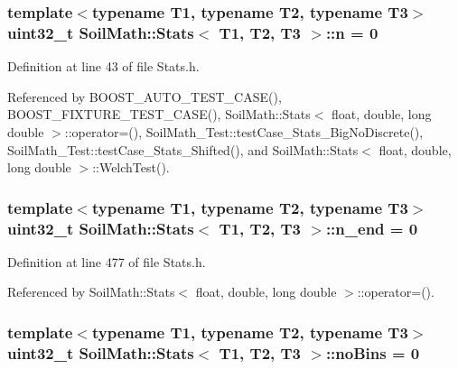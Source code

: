 \subsubsection[{n}]{\setlength{\rightskip}{0pt plus 5cm}template$<$typename T1, typename T2, typename T3$>$ uint32\+\_\+t {\bf Soil\+Math\+::\+Stats}$<$ T1, T2, T3 $>$\+::n = 0}\label{class_soil_math_1_1_stats_a7bc57af334b68253832ebac17f85d091}


Definition at line 43 of file Stats.\+h.



Referenced by B\+O\+O\+S\+T\+\_\+\+A\+U\+T\+O\+\_\+\+T\+E\+S\+T\+\_\+\+C\+A\+S\+E(), B\+O\+O\+S\+T\+\_\+\+F\+I\+X\+T\+U\+R\+E\+\_\+\+T\+E\+S\+T\+\_\+\+C\+A\+S\+E(), Soil\+Math\+::\+Stats$<$ float, double, long double $>$\+::operator=(), Soil\+Math\+\_\+\+Test\+::test\+Case\+\_\+\+Stats\+\_\+\+Big\+No\+Discrete(), Soil\+Math\+\_\+\+Test\+::test\+Case\+\_\+\+Stats\+\_\+\+Shifted(), and Soil\+Math\+::\+Stats$<$ float, double, long double $>$\+::\+Welch\+Test().

\hypertarget{class_soil_math_1_1_stats_a58553c8379f35dbc40f46ad228b5457e}{}
\subsubsection[{n\+\_\+end}]{\setlength{\rightskip}{0pt plus 5cm}template$<$typename T1, typename T2, typename T3$>$ uint32\+\_\+t {\bf Soil\+Math\+::\+Stats}$<$ T1, T2, T3 $>$\+::n\+\_\+end = 0\hspace{0.3cm}{\ttfamily [private]}}\label{class_soil_math_1_1_stats_a58553c8379f35dbc40f46ad228b5457e}


Definition at line 477 of file Stats.\+h.



Referenced by Soil\+Math\+::\+Stats$<$ float, double, long double $>$\+::operator=().

\hypertarget{class_soil_math_1_1_stats_a4202c9085eacaff2e04eda84fc90e92b}{}
\subsubsection[{no\+Bins}]{\setlength{\rightskip}{0pt plus 5cm}template$<$typename T1, typename T2, typename T3$>$ uint32\+\_\+t {\bf Soil\+Math\+::\+Stats}$<$ T1, T2, T3 $>$\+::no\+Bins = 0}\label{class_soil_math_1_1_stats_a4202c9085eacaff2e04eda84fc90e92b}


